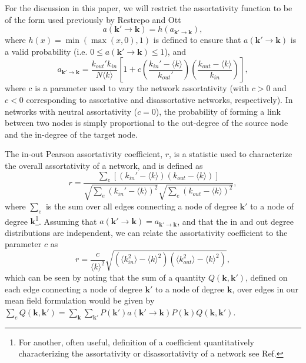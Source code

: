 \documentclass[%
 aip,
 sd,%
 amsmath,amssymb,
 reprint,%
]{revtex4-1}
\begin{document}
For the discussion in this paper, we will restrict the assortativity function to be of the form used previously by Restrepo and Ott \cite{restrepo2014mean}
\begin{equation} \label{eq:assort1}
a(\mathbf{k'} \rightarrow \mathbf{k}) = h(a_{\mathbf{k'} \rightarrow \mathbf{k}}),
\end{equation}
where $h(x)=\min(\max(x,0),1)$ is defined to ensure that $a(\mathbf{k'} \rightarrow \mathbf{k})$ is a valid probability (i.e. $0\leq a(\mathbf{k'} \rightarrow \mathbf{k}) \leq 1$), and 
\begin{equation}\label{eq:assort}
a_{\mathbf{k'} \rightarrow \mathbf{k}}  = \frac{k_{out}' k_{in}}{N \langle k \rangle} \left[1 + c \left(\frac{k_{in}' - \langle k \rangle}{k_{out}'} \right) \left( \frac{k_{out} - \langle k \rangle}{k_{in}} \right) \right],
\end{equation}
where c is a parameter used to vary the network assortativity (with $c>0$ and $c<0$  corresponding to assortative and disassortative networks, respectively). In networks with neutral assortativity ($c=0$), the probability of forming a link between two nodes is simply proportional to the out-degree of the source node and the in-degree of the target node. 

The in-out Pearson assortativity coefficient, $r$, is a statistic used to characterize the overall assortativity of a network, and is defined\cite{foster2010edge} as 
\begin{equation} \label{eq:pearson}
r = \frac{\sum_e \left[ (k_{in}' - \langle k \rangle) (k_{out} - \langle k \rangle) \right]}{\sqrt{\sum_e (k_{in}' - \langle k \rangle)^2} \sqrt{\sum_e (k_{out} - \langle k \rangle)^2}},
\end{equation}
where $\sum_e$ is the sum over all edges connecting a node of degree $\mathbf{k'}$ to a node of degree $\mathbf{k}$\footnote{For another, often useful, definition of a coefficient quantitatively characterizing the assortativity or disassortativity of a network see Ref.\cite{restrepo2007approximating}}. Assuming that $a(\mathbf{k'} \rightarrow \mathbf{k}) = a_{\mathbf{k'} \rightarrow \mathbf{k}}$, and that the in and out degree distributions are independent, we can relate the assortativity coefficient to the parameter $c$ as 
\begin{equation}\label{eq:pearsonC}
r = \frac{c}{\langle k \rangle^2} \sqrt{(\langle k_{in}^2 \rangle - \langle k \rangle^2)(\langle k_{out}^2 \rangle - \langle k \rangle^2)},
\end{equation}
which can be seen by noting that the sum of a quantity $Q(\mathbf{k},\mathbf{k'})$, defined on each edge connecting a node of degree $\mathbf{k'}$ to a node of degree $\mathbf{k}$, over edges in our mean field formulation would be given by $\sum_e Q(\mathbf{k},\mathbf{k'}) = \sum_{\mathbf{k}} \sum_{\mathbf{k'}} P(\mathbf{k'}) a(\mathbf{k'} \rightarrow \mathbf{k}) P(\mathbf{k}) Q(\mathbf{k},\mathbf{k'})$.
\end{document}
